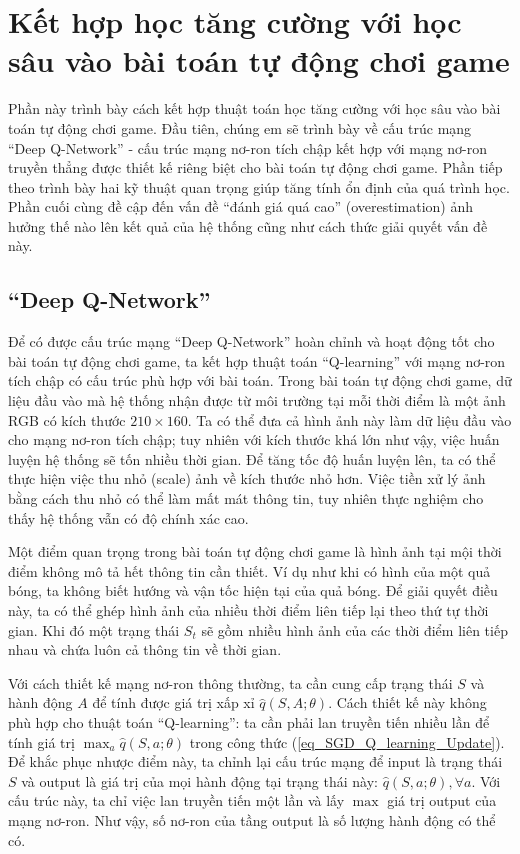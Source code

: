 \section{Kết hợp học tăng cường với học sâu vào bài toán tự động chơi game}
	Phần này trình bày cách kết hợp thuật toán học tăng cường với học sâu vào bài toán tự động chơi game.
	Đầu tiên, chúng em sẽ trình bày về cấu trúc mạng ``Deep Q-Network'' \cite{mnihdqn2015} - cấu trúc mạng nơ-ron tích chập kết hợp với mạng nơ-ron truyền thẳng được thiết kế riêng biệt cho bài toán tự động chơi game.
	Phần tiếp theo trình bày hai kỹ thuật quan trọng giúp tăng tính ổn định của quá trình học.
	Phần cuối cùng đề cập đến vấn đề ``đánh giá quá cao'' (overestimation) ảnh hưởng thế nào lên kết quả của hệ thống cũng như cách thức giải quyết vấn đề này.
	
\subsection{``Deep Q-Network''}
	Để có được cấu trúc mạng ``Deep Q-Network'' \cite{mnihdqn2015} hoàn chỉnh và hoạt động tốt cho bài toán tự động chơi game, ta kết hợp thuật toán ``Q-learning'' với mạng nơ-ron tích chập có cấu trúc phù hợp với bài toán.
	Trong bài toán tự động chơi game, dữ liệu đầu vào mà hệ thống nhận được từ môi trường tại mỗi thời điểm là một ảnh RGB có kích thước $210\times160$.
	Ta có thể đưa cả hình ảnh này làm dữ liệu đầu vào cho mạng nơ-ron tích chập; tuy nhiên với kích thước khá lớn như vậy, việc huấn luyện hệ thống sẽ tốn nhiều thời gian.
	Để tăng tốc độ huấn luyện lên, ta có thể thực hiện việc thu nhỏ (scale) ảnh về kích thước nhỏ hơn.
	Việc tiền xử lý ảnh bằng cách thu nhỏ có thể làm mất mát thông tin, tuy nhiên thực nghiệm cho thấy hệ thống vẫn có độ chính xác cao.
	
	Một điểm quan trọng trong bài toán tự động chơi game là hình ảnh tại mội thời điểm không mô tả hết thông tin cần thiết.
	Ví dụ như khi có hình của một quả bóng, ta không biết hướng và vận tốc hiện tại của quả bóng.
	Để giải quyết điều này, ta có thể ghép hình ảnh của nhiều thời điểm liên tiếp lại theo thứ tự thời gian.
	Khi đó một trạng thái $S_t$ sẽ gồm nhiều hình ảnh của các thời điểm liên tiếp nhau và chứa luôn cả thông tin về thời gian.
	
	Với cách thiết kế mạng nơ-ron thông thường, ta cần cung cấp trạng thái $S$ và hành động $A$ để tính được giá trị xấp xỉ $\hat{q}(S, A;\theta)$.
	Cách thiết kế này không phù hợp cho thuật toán ``Q-learning'': ta cần phải lan truyền tiến nhiều lần để tính giá trị $\max_{a}\hat{q}(S, a;\theta)$ trong công thức (\ref{eq_SGD_Q_learning_Update}).
	Để khắc phục nhược điểm này, ta chỉnh lại cấu trúc mạng để input là trạng thái $S$ và output là giá trị của mọi hành động tại trạng thái này: $\hat{q}(S, a;\theta), \forall a$.
	Với cấu trúc này, ta chỉ việc lan truyền tiến một lần và lấy $\max$ giá trị output của mạng nơ-ron.
	Như vậy, số nơ-ron của tầng output là số lượng hành động có thể có.
	

